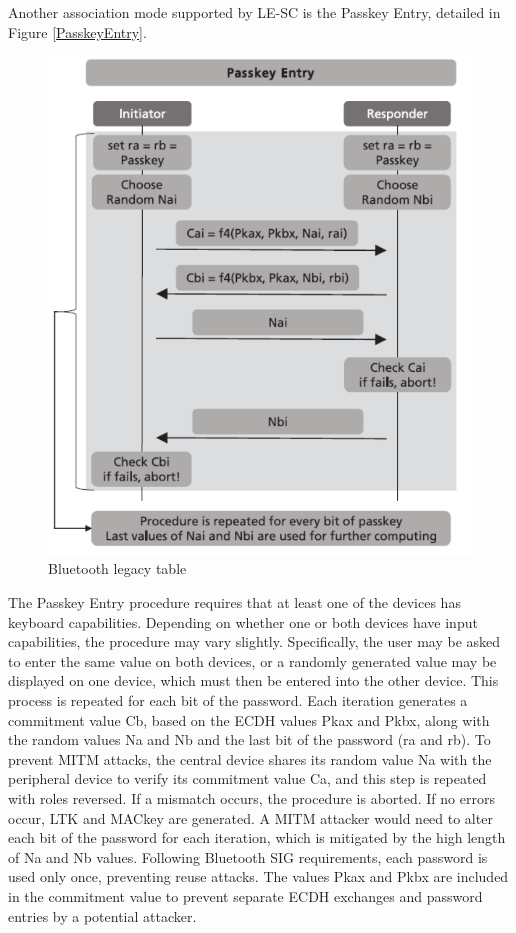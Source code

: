 \documentclass{Configuration_Files/PoliMi3i_thesis}
\begin{document}
Another association mode supported by LE-SC is the Passkey Entry, detailed in Figure \ref{PasskeyEntry}.

\begin{figure}[H]
    \centering
    \includegraphics[scale=0.7]{Bluetooth_Security/7.png}
    \caption{Bluetooth legacy table}
    \label{bluetooth_sec_7}
\end{figure}

The Passkey Entry procedure requires that at least one of the devices has keyboard capabilities. Depending on whether one or both devices have input capabilities, the procedure may vary slightly. Specifically, the user may be asked to enter the same value on both devices, or a randomly generated value may be displayed on one device, which must then be entered into the other device. This process is repeated for each bit of the password. Each iteration generates a commitment value Cb, based on the ECDH values Pkax and Pkbx, along with the random values Na and Nb and the last bit of the password (ra and rb). To prevent MITM attacks, the central device shares its random value Na with the peripheral device to verify its commitment value Ca, and this step is repeated with roles reversed. If a mismatch occurs, the procedure is aborted. If no errors occur, LTK and MACkey are generated. A MITM attacker would need to alter each bit of the password for each iteration, which is mitigated by the high length of Na and Nb values. Following Bluetooth SIG requirements, each password is used only once, preventing reuse attacks. The values Pkax and Pkbx are included in the commitment value to prevent separate ECDH exchanges and password entries by a potential attacker.
\end{document}
